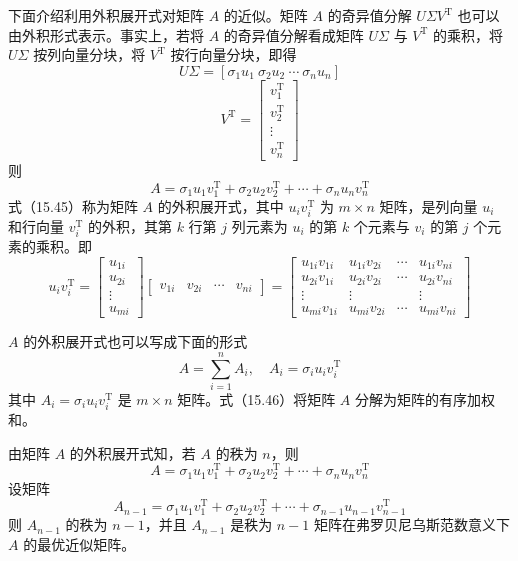 \documentclass[UTF8, 12pt, fontset=fandol, oneside]{ctexart}
\begin{document}
下面介绍利用外积展开式对矩阵 $A$ 的近似。矩阵 $A$ 的奇异值分解 $U\Sigma V^{\mathrm{T}}$ 也可以由外积形式表示。事实上，若将 $A$ 的奇异值分解看成矩阵 $U\Sigma$ 与 $V^{\mathrm{T}}$ 的乘积，将 $U\Sigma$ 按列向量分块，将 $V^{\mathrm{T}}$ 按行向量分块，即得
\[
U\Sigma=[\sigma_1u_1\ \sigma_2u_2\ \cdots\ \sigma_nu_n]
\]
\[
V^{\mathrm{T}}=
\begin{bmatrix}
v_1^{\mathrm{T}}\\
v_2^{\mathrm{T}}\\
\vdots\\
v_n^{\mathrm{T}}
\end{bmatrix}
\]
则
\begin{equation}
A=\sigma_1u_1v_1^{\mathrm{T}}+\sigma_2u_2v_2^{\mathrm{T}}+\cdots+\sigma_nu_nv_n^{\mathrm{T}}
\tag{15.45}
\end{equation}
式（15.45）称为矩阵 $A$ 的外积展开式，其中 $u_iv_i^{\mathrm{T}}$ 为 $m\times n$ 矩阵，是列向量 $u_i$ 和行向量 $v_i^{\mathrm{T}}$ 的外积，其第 $k$ 行第 $j$ 列元素为 $u_i$ 的第 $k$ 个元素与 $v_i$ 的第 $j$ 个元素的乘积。即
\[
u_iv_i^{\mathrm{T}}=
\begin{bmatrix}
u_{1i}\\
u_{2i}\\
\vdots\\
u_{mi}
\end{bmatrix}
\begin{bmatrix}
v_{1i}&v_{2i}&\cdots&v_{ni}
\end{bmatrix}
=
\begin{bmatrix}
u_{1i}v_{1i}&u_{1i}v_{2i}&\cdots&u_{1i}v_{ni}\\
u_{2i}v_{1i}&u_{2i}v_{2i}&\cdots&u_{2i}v_{ni}\\
\vdots&\vdots&&\vdots\\
u_{mi}v_{1i}&u_{mi}v_{2i}&\cdots&u_{mi}v_{ni}
\end{bmatrix}
\]

$A$ 的外积展开式也可以写成下面的形式
\begin{equation}
A=\sum_{i=1}^n A_i,\quad A_i=\sigma_iu_iv_i^{\mathrm{T}}
\tag{15.46}
\end{equation}
其中 $A_i=\sigma_iu_iv_i^{\mathrm{T}}$ 是 $m\times n$ 矩阵。式（15.46）将矩阵 $A$ 分解为矩阵的有序加权和。

由矩阵 $A$ 的外积展开式知，若 $A$ 的秩为 $n$，则
\begin{equation}
A=\sigma_1u_1v_1^{\mathrm{T}}+\sigma_2u_2v_2^{\mathrm{T}}+\cdots+\sigma_nu_nv_n^{\mathrm{T}}
\tag{15.47}
\end{equation}
设矩阵
\[
A_{n-1}=\sigma_1u_1v_1^{\mathrm{T}}+\sigma_2u_2v_2^{\mathrm{T}}+\cdots+\sigma_{n-1}u_{n-1}v_{n-1}^{\mathrm{T}}
\]
则 $A_{n-1}$ 的秩为 $n-1$，并且 $A_{n-1}$ 是秩为 $n-1$ 矩阵在弗罗贝尼乌斯范数意义下 $A$ 的最优近似矩阵。
\end{document}
